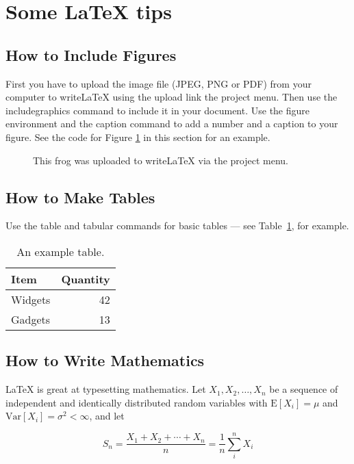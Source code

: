 \documentclass[a4paper]{article}
\begin{document}
\section{Some LaTeX tips}
\label{sec:latex}
\subsection{How to Include Figures}

First you have to upload the image file (JPEG, PNG or PDF) from your computer to writeLaTeX using the upload link the project menu. Then use the includegraphics command to include it in your document. Use the figure environment and the caption command to add a number and a caption to your figure. See the code for Figure \ref{fig:frog} in this section for an example.

\begin{figure}
	\centering
	\caption{\label{fig:frog}This frog was uploaded to writeLaTeX via the project menu.}
\end{figure}

\subsection{How to Make Tables}

Use the table and tabular commands for basic tables --- see Table~\ref{tab:widgets}, for example.

\begin{table}
	\centering
	\begin{tabular}{l|r}
		Item    & Quantity \\\hline
		Widgets & 42       \\
		Gadgets & 13
	\end{tabular}
	\caption{\label{tab:widgets}An example table.}
\end{table}

\subsection{How to Write Mathematics}

\LaTeX{} is great at typesetting mathematics. Let $X_1, X_2, \ldots, X_n$ be a sequence of independent and identically distributed random variables with $\text{E}[X_i] = \mu$ and $\text{Var}[X_i] = \sigma^2 < \infty$, and let

\begin{equation}
	S_n = \frac{X_1 + X_2 + \cdots + X_n}{n}
	= \frac{1}{n}\sum_{i}^{n} X_i
	\label{eq:sn}
\end{equation}
\end{document}
